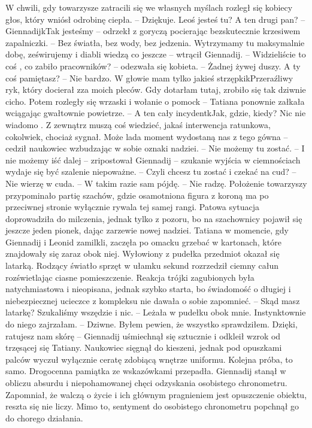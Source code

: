 \documentclass[../MAIN.tex]{subfiles}
\begin{document}
W chwili, gdy towarzysze zatracili się we własnych myślach rozległ się kobiecy głos, który wniósł odrobinę ciepła. 
-- Dziękuje. Leoś jesteś tu? A ten drugi pan? 
-- Giennadij\3kTak jesteśmy -- odrzekł z goryczą pocierając bezskutecznie krzesiwem zapalniczki. 
-- Bez światła, bez wody, bez jedzenia. Wytrzymamy tu maksymalnie dobę, ześwirujemy i diabli wiedzą co jeszcze -- wtrącił Giennadij. 
-- Widzieliście to coś , co zabiło pracowników? -- odezwała się kobieta. 
-- Żadnej żywej duszy. A ty coś pamiętasz? 
-- Nie bardzo. W głowie mam tylko jakieś strzępki\3kPrzeraźliwy ryk, który docierał zza moich pleców. Gdy dotarłam tutaj, zrobiło się tak dziwnie cicho. Potem rozległy się wrzaski i wołanie o pomoc\3k -- Tatiana ponownie załkała wciągając gwałtownie powietrze. 
-- A ten cały incydent\3kJak, gdzie, kiedy? Nic nie wiadomo . Z zewnątrz muszą coś wiedzieć, jakaś interwencja ratunkowa, cokolwiek, chociaż sygnał. Może lada moment wydostaną nas z tego gówna -- cedził naukowiec wzbudzając w sobie oznaki nadziei. 
-- Nie możemy tu zostać. 
-- I nie możemy iść dalej -- zripostował Giennadij -- szukanie wyjścia w ciemnościach wydaje się być szalenie niepoważne. 
-- Czyli chcesz tu zostać i czekać na cud? 
-- Nie wierzę w cuda. 
-- W takim razie sam pójdę. 
-- Nie radzę. 
Położenie towarzyszy przypominało partię szachów, gdzie osamotniona figura z koroną ma po przeciwnej stronie wyłącznie rywala tej samej rangi. Patowa sytuacja doprowadziła do milczenia, jednak tylko z pozoru, bo na szachownicy pojawił się jeszcze jeden pionek, dając zarzewie nowej nadziei. Tatiana w momencie, gdy Giennadij i Leonid zamilkli, zaczęła po omacku grzebać w kartonach, które znajdowały się zaraz obok niej. Wyłowiony z pudełka przedmiot okazał się latarką. Rodzący światło sprzęt w ułamku sekund rozrzedził ciemny całun rozświetlając ciasne pomieszczenie. Reakcja trójki zagubionych była natychmiastowa i nieopisana, jednak szybko starta, bo świadomość o długiej i niebezpiecznej ucieczce z kompleksu nie dawała o sobie zapomnieć. 
-- Skąd masz latarkę? Szukaliśmy wszędzie i nic. 
-- Leżała w pudełku obok mnie. Instynktownie do niego zajrzałam. 
-- Dziwne. Byłem pewien, że wszystko sprawdziłem. Dzięki, ratujesz nam skórę -- Giennadij uśmiechnął się sztucznie i odkleił wzrok od trzęsącej się Tatiany. 
Naukowiec sięgnął do kieszeni, jednak pod opuszkami palców wyczuł wyłącznie ceratę zdobiącą wnętrze uniformu. Kolejna próba, to samo. Drogocenna pamiątka ze wskazówkami przepadła. Giennadij stanął w obliczu absurdu i niepohamowanej chęci odzyskania osobistego chronometru. Zapomniał, że walczą o życie i ich głównym pragnieniem jest opuszczenie obiektu, reszta się nie liczy. Mimo to, sentyment do osobistego chronometru popchnął go do chorego działania. 
\end{document}

